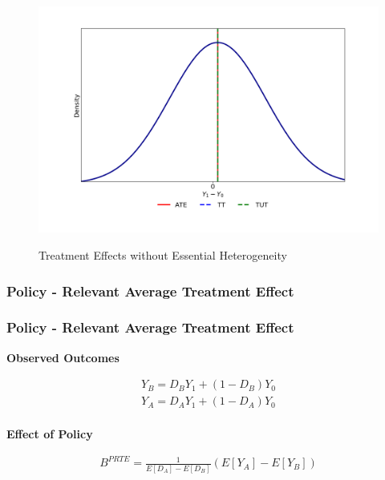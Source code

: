 \begin{frame}

\begin{figure}[htp]\centering
	\caption{Treatment Effects without Essential Heterogeneity}\label{Treatment Effects Without Essential Heterogeneity}\scalebox{0.35}
	{\includegraphics{./material/fig-treatment-effects-without-eh.png}}
\end{figure}

\end{frame}


\begin{frame}
    \subsubsection{Policy - Relevant Average Treatment Effect}\label{policy---relevant-average-treatment-effect}
\frametitle{Policy - Relevant Average Treatment Effect}   

\textbf{Observed Outcomes}

\begin{align*}
Y_B = D_B Y_1 + (1 - D_B) Y_0 \\
Y_A = D_A Y_1 + (1 - D_A) Y_0 \\
\end{align*}

\textbf{Effect of Policy}

\begin{align*}
B^{PRTE} = \frac{1}{E[D_A] - E[D_B]} (E[Y_A] - E[Y_B])
\end{align*}

\end{frame}


